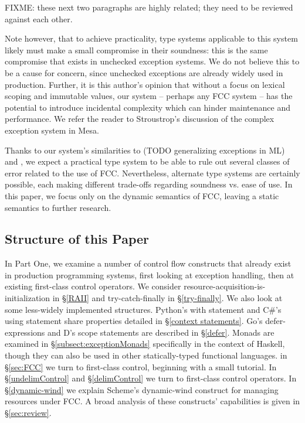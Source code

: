 \documentclass[11pt]{article}
\newcommand{\maybePage}{\newpage}
\begin{document}
FIXME: these next two paragraphs are highly related; they need to be reviewed against each other.

Note however, that to achieve practicality, type systems applicable to this system likely must make a small compromise in their soundness: this is the same compromise that exists in unchecked exception systems.
We do not believe this to be a cause for concern, since unchecked exceptions are already widely used in production.
Further, it is this author's opinion that without a focus on lexical scoping and immutable values, our system -- perhaps any FCC system -- has the potential to introduce incidental complexity which can hinder maintenance and performance.
We refer the reader to Stroustrop's discussion\cite{evolutionCplusplus} of the complex exception system in Mesa.

Thanks to our system's similarities to (TODO generalizing exceptions in ML) and \cite{MFDC}, we expect a practical type system to be able to rule out several classes of error related to the use of FCC.
Nevertheless, alternate type systems are certainly possible, each making different trade-offs regarding soundness vs. ease of use.
In this paper, we focus only on the dynamic semantics of FCC, leaving a static semantics to further research.


\maybePage
\subsection{Structure of this Paper}

In Part One, we examine a number of control flow constructs that already exist in production programming systems, first looking at exception handling, then at existing first-class control operators.
We consider resource-acquisition-is-initialization in \S\ref{RAII} and try-catch-finally in \S\ref{try-finally}.
We also look at some less-widely implemented structures.
Python's with statement and C\#'s using statement share properties detailed in \S\ref{context statements}.
Go's defer-expressions and D's scope statements are described in \S\ref{defer}.
Monads are examined in \S\ref{subsect:exceptionMonads} specifically in the context of Haskell, though they can also be used in other statically-typed functional languages.
in \S\ref{sec:FCC} we turn to first-class control, beginning with a small tutorial.
In \S\ref{undelimControl} and \S\ref{delimControl} we turn to first-class control operators.
In \S\ref{dynamic-wind} we explain Scheme's dynamic-wind construct for managing resources under FCC.
A broad analysis of these constructs' capabilities is given in \S\ref{sec:review}.
\end{document}
